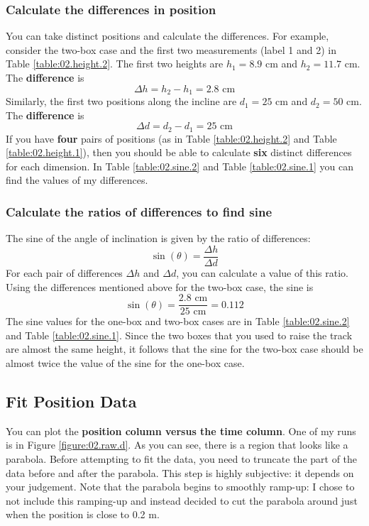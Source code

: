 \subsubsection{Calculate the differences in position}
%
You can take distinct positions and calculate the differences. For example, consider the two-box case and the first two measurements (label 1 and 2) in Table \ref{table:02.height.2}. The first two heights are $h_{1} = 8.9$ cm and $h_{2} = 11.7$ cm. The \textbf{difference} is
\begin{equation}
    \Delta h = h_{2} - h_{1} = 2.8 \text{ cm}
\end{equation}
Similarly, the first two positions along the incline are $d_{1} = 25$ cm and $d_{2} = 50$ cm. The \textbf{difference} is
\begin{equation}
    \Delta d = d_{2} - d_{1} = 25 \text{ cm}
\end{equation}
If you have \textbf{four} pairs of positions (as in Table \ref{table:02.height.2} and Table \ref{table:02.height.1}), then you should be able to calculate \textbf{six} distinct differences for each dimension. In Table \ref{table:02.sine.2} and Table \ref{table:02.sine.1} you can find the values of my differences.
%
\subsubsection{Calculate the ratios of differences to find sine}
%
The sine of the angle of inclination is given by the ratio of differences:
\begin{equation}
    \sin(\theta) = \frac{\Delta h}{\Delta d}
\end{equation}
For each pair of differences $\Delta h$ and $\Delta d$, you can calculate a value of this ratio. Using the differences mentioned above for the two-box case, the sine is
\begin{equation}
    \sin(\theta) = \frac{2.8 \text{ cm}}{25 \text{ cm}} = 0.112
\end{equation}
The sine values for the one-box and two-box cases are in Table \ref{table:02.sine.2} and Table \ref{table:02.sine.1}. Since the two boxes that you used to raise the track are almost the same height, it follows that the sine for the two-box case should be almost twice the value of the sine for the one-box case.
%
\subsection{Fit Position Data}
%
You can plot the \textbf{position column versus the time column}. One of my runs is in Figure \ref{figure:02.raw.d}. As you can see, there is a region that looks like a parabola. Before attempting to fit the data, you need to truncate the part of the data before and after the parabola. This step is highly subjective: it depends on your judgement. Note that the parabola begins to smoothly ramp-up: I chose to not include this ramping-up and instead decided to cut the parabola around just when the position is close to 0.2 m.

